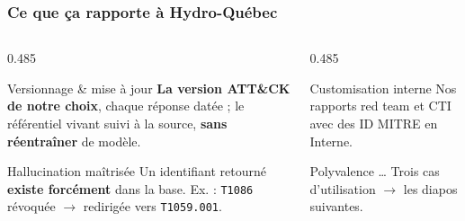 \documentclass[aspectratio=169,11pt]{beamer}
\begin{document}
\begin{frame}
  \frametitle{Ce que \c{c}a rapporte \`a Hydro-Qu\'ebec}
  \vspace{0.15cm}
  \begin{columns}[T]
    \begin{column}{0.485\textwidth}
      \begin{block}{Versionnage \& mise \`a jour}
        \footnotesize \textbf{La version ATT\&CK de notre choix}, chaque
        r\'eponse dat\'ee ; le r\'ef\'erentiel vivant suivi \`a la source,
        \textbf{sans r\'eentra\^iner} de mod\`ele.
      \end{block}
      \vspace{0.25cm}
      \begin{block}{Hallucination ma\^itris\'ee}
        \footnotesize Un identifiant retourn\'e \textbf{existe forc\'ement}
        dans la base. Ex. : \texttt{T1086} r\'evoqu\'ee $\rightarrow$
        redirig\'ee vers \texttt{T1059.001}.
      \end{block}
    \end{column}
    \begin{column}{0.485\textwidth}
      \begin{block}{Customisation interne}
        \footnotesize Nos rapports red team et CTI avec des ID MITRE en Interne.
      \end{block}
      \vspace{0.25cm}
      \begin{exampleblock}{Polyvalence}
        \footnotesize \ldots{}
        Trois cas d'utilisation $\rightarrow$ les diapos suivantes.
      \end{exampleblock}
    \end{column}
  \end{columns}
\end{frame}
\end{document}

